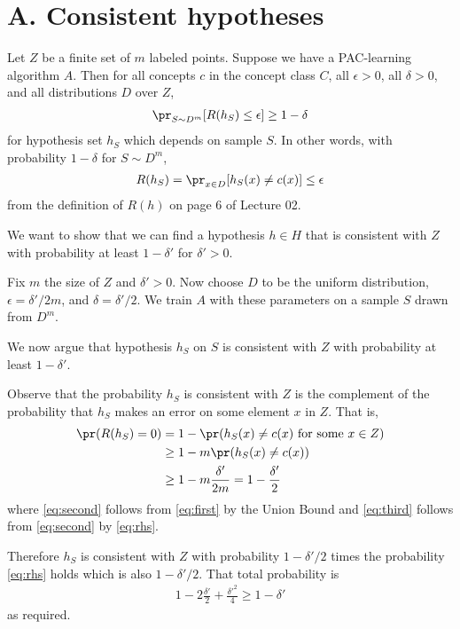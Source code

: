 
\section*{A. Consistent hypotheses}
\medskip

Let $Z$ be a finite set of $m$ labeled points.
Suppose we have a PAC-learning algorithm $A$.
Then
for all concepts $c$ in the concept class $C$,
all $\epsilon > 0$, all $\delta > 0$, and all distributions
$D$ over $Z$,
\begin{align}
    \pr_{S \sim D^m}[R(h_S)\leq \epsilon]
    \geq 1 - \delta
    \nonumber
\end{align}
for hypothesis set $h_S$ which depends
on sample $S$.
In other words,
with probability $1-\delta$ for $S\sim D^m$,
\begin{align}\label{eq:rhs}
    R(h_S) = \pr_{x\in D}[h_S(x)\neq c(x)] \leq \epsilon
\end{align}
from the definition of $R(h)$ on page 6 of Lecture 02.

We want to show that we can find a hypothesis
$h \in H$ that is consistent with $Z$ with
probability at least $1-\delta'$ for $\delta'>0$.

Fix $m$ the size of $Z$ and $\delta' >0$.
Now choose $D$ to be the uniform
distribution, $\epsilon=\delta'/2m$,
and $\delta=\delta'/2$.
We train $A$ with these parameters
on a sample $S$ drawn from $D^m$.

We now argue that hypothesis $h_S$
on $S$ is consistent with $Z$ with probability
at least $1-\delta'$.

Observe that the probability $h_S$
is consistent with $Z$ is the complement
of the probability that $h_S$ makes an
error on some element $x$ in $Z$.
That is,
\begin{align}
    \pr(R(h_S) = 0) &= 1
    - \pr(h_S(x) \neq c(x)
    \textrm{ for some } x \in Z)
    \label{eq:first} \\
    &\geq 1 - m \pr(h_S(x) \neq c(x))
    \label{eq:second} \\
    & \geq 1- m \frac{\delta'}{2m}
    = 1 - \frac{\delta'}{2}
    \label{eq:third}
\end{align}
where \autoref{eq:second} follows
from \autoref{eq:first} by the Union Bound
and \autoref{eq:third} follows from
\autoref{eq:second} by \autoref{eq:rhs}.

Therefore $h_S$ is consistent with $Z$
with probability $1-\delta'/2$ times
the probability \autoref{eq:rhs} holds
which is also $1-\delta'/2$.
That total probability is
\begin{align}
    1-2\frac{\delta'}{2} + \frac{\delta'^2}{4}
    \geq 1-\delta'
    \nonumber
\end{align}
as required.

